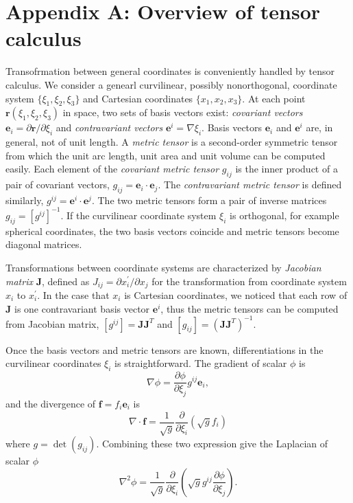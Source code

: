 \appendix
\section{Appendix A: Overview of tensor calculus}

Transofrmation between general coordinates is conveniently handled by tensor calculus.
We consider a genearl curvilinear, possibly nonorthogonal, coordinate system $\lbrace\xi_1,\xi_2,\xi_3\rbrace$ and Cartesian coordinates $\lbrace x_1,x_2,x_3\rbrace$. At each point $\mathbf{r}(\xi_1,\xi_2,\xi_3)$ in space, two sets of basis vectors exist: \textit{covariant vectors} $\mathbf{e}_i = \partial \mathbf{r} / \partial \xi_i$ and \textit{contravariant vectors} $\mathbf{e}^i = \nabla \xi_i$. 
Basis vectors $\mathbf{e}_i$ and $\mathbf{e}^i$ are, in general, not of unit length.
A \textit{metric tensor} is a second-order symmetric tensor from which the unit arc length, unit area and unit volume can be computed easily. Each element of the \textit{covariant metric tensor} $g_{ij}$ is the inner product of a pair of covariant vectors, $g_{ij} = \mathbf{e}_i \cdot \mathbf{e}_j$. The \textit{contravariant metric tensor} is defined similarly, $g^{ij} = \mathbf{e}^i \cdot \mathbf{e}^j$.
The two metric tensors form a pair of inverse matrices $g_{ij} = [g^{ij}]^{-1}$. If the curvilinear coordinate system $\xi_i$ is orthogonal, for example spherical coordinates, the two basis vectors coincide and metric tensors become diagonal matrices.

Transformations between coordinate systems are characterized by \textit{Jacobian matrix} $\mathbf{J}$, defined as $J_{ij} = \partial x^\prime_i / \partial x_j$ for the transformation from coordinate system $x_i$ to $x^\prime_i$. In the case that $x_i$ is Cartesian coordinates, we noticed that each row of $\mathbf{J}$ is one contravariant basis vector $\mathbf{e}^i$, thus the metric tensors can be computed from Jacobian matrix, $[g^{ij}] = \mathbf{J} \mathbf{J}^T$ and $[g_{ij}] = (\mathbf{J} \mathbf{J}^T)^{-1}$.

Once the basis vectors and metric tensors are known, differentiations in the curvilinear coordinates $\xi_i$ is straightforward. The gradient of scalar $\phi$ is~\cite[]{riley2006mm}
\begin{equation}
\nabla \phi = \frac{\partial \phi}{\partial \xi_j} g^{ij} \mathbf{e}_i ,
\end{equation}
and the divergence of $\mathbf{f} = f_i\mathbf{e}_i$ is
\begin{equation}
\nabla \cdot \mathbf{f} =  \frac{1}{\sqrt{g}} \frac{\partial}{\partial \xi_i}\left(\sqrt{g} f_i\right)
\end{equation}
where $g = \det(g_{ij})$. Combining these two expression give the Laplacian of scalar $\phi$
\begin{equation}
\nabla^2 \phi = \frac{1}{\sqrt{g}} \frac{\partial}{\partial \xi_i}\left(\sqrt{g} g^{ij} \frac{\partial \phi}{\partial \xi_j}\right) .
\end{equation}

